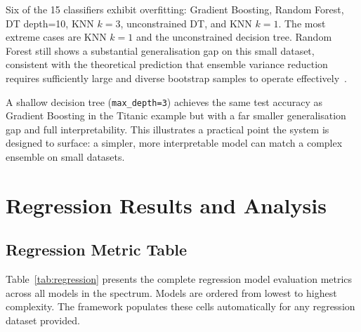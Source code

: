 \documentclass[conference]{IEEEtran}
\begin{document}
Six of the 15 classifiers exhibit overfitting: Gradient Boosting, Random Forest, DT depth=10, KNN $k=3$, unconstrained DT, and KNN $k=1$. The most extreme cases are KNN $k=1$ and the unconstrained decision tree. Random Forest still shows a substantial generalisation gap on this small dataset, consistent with the theoretical prediction that ensemble variance reduction requires sufficiently large and diverse bootstrap samples to operate effectively~\cite{b12}.

A shallow decision tree (\texttt{max\_depth=3}) achieves the same test accuracy as Gradient Boosting in the Titanic example but with a far smaller generalisation gap and full interpretability. This illustrates a practical point the system is designed to surface: a simpler, more interpretable model can match a complex ensemble on small datasets.

\section{Regression Results and Analysis}

\subsection{Regression Metric Table}

Table~\ref{tab:regression} presents the complete regression model evaluation metrics across all models in the spectrum. Models are ordered from lowest to highest complexity. The framework populates these cells automatically for any regression dataset provided.
\end{document}
